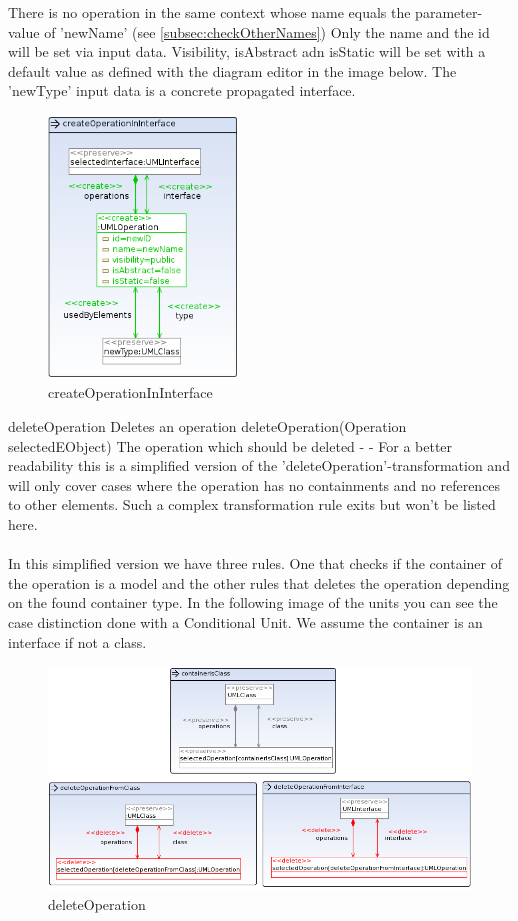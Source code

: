 {There is no operation in the same context whose name equals the parameter-value
of 'newName' (see
\ref{subsec:checkOtherNames})}
{Only the name and the id will be set via input data. Visibility, isAbstract adn
isStatic will be set with a default value as defined with the diagram editor in
the image below. The 'newType' input data is a concrete propagated interface.}
\begin{figure}[H]
  \centering
  \includegraphics[width=0.45\textwidth]{pics/createOperationInInterface.png}
  \caption{createOperationInInterface}
  \label{createOperationInInterface}
\end{figure}
\op
{deleteOperation}
{Deletes an operation}
{deleteOperation(Operation selectedEObject)}
{The operation which should be deleted} {-}
{-}
{For a better readability this is a simplified version of the
'deleteOperation'-transformation and will only cover cases where the operation
has no containments and no references to other elements. Such a complex
transformation rule exits but won't be listed here.
\\\\In this simplified version we have three rules. One that checks if the
container of the operation is a model and the other rules that deletes the
operation depending on the found container type. In the following image of the
units you can see the case distinction done with a Conditional Unit. We assume
the container is an interface if not a class.}
\begin{figure}[H]
\advance\leftskip-1.5cm
  \includegraphics[width=1.2\textwidth]{pics/deleteOperation_emptyAndUnreferenced.png}
  \caption{deleteOperation}
  \label{deleteOperation}
\end{figure}

